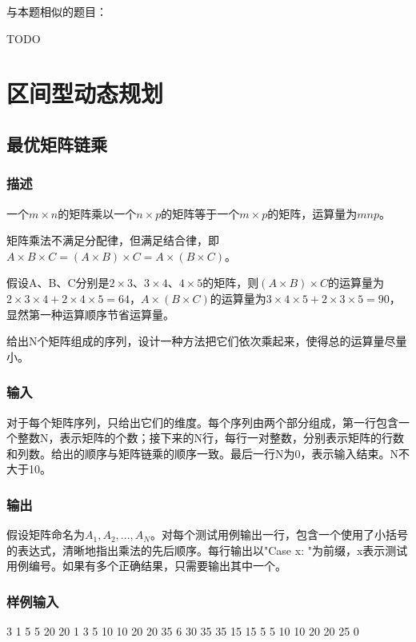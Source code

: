 与本题相似的题目：
\begindot
\item  TODO
\myenddot


\section{区间型动态规划} %


\subsection{最优矩阵链乘}
\subsubsection{描述}
一个$m \times n$的矩阵乘以一个$n \times p$的矩阵等于一个$m \times p$的矩阵，运算量为$mnp$。

矩阵乘法不满足分配律，但满足结合律，即$A \times B \times C=(A \times B) \times C=A \times (B \times C)$。

假设A、B、C分别是$2 \times 3$、$3 \times 4$、$4 \times 5$的矩阵，则$(A \times B) \times C$的运算量为$2 \times 3 \times 4 + 2 \times 4 \times 5=64$，$A \times (B \times C)$的运算量为$3 \times 4 \times 5 + 2 \times 3 \times 5=90$，显然第一种运算顺序节省运算量。

给出N个矩阵组成的序列，设计一种方法把它们依次乘起来，使得总的运算量尽量小。

\subsubsection{输入}
对于每个矩阵序列，只给出它们的维度。每个序列由两个部分组成，第一行包含一个整数N，表示矩阵的个数；接下来的N行，每行一对整数，分别表示矩阵的行数和列数。给出的顺序与矩阵链乘的顺序一致。最后一行N为0，表示输入结束。N不大于10。

\subsubsection{输出}
假设矩阵命名为$A_1,A_2,...,A_N$。对每个测试用例输出一行，包含一个使用了小括号的表达式，清晰地指出乘法的先后顺序。每行输出以"Case x: "为前缀，x表示测试用例编号。如果有多个正确结果，只需要输出其中一个。

\subsubsection{样例输入}
\begin{Code}
3
1 5
5 20
20 1
3
5 10
10 20
20 35
6
30 35
35 15
15 5
5 10
10 20
20 25
0
\end{Code}

